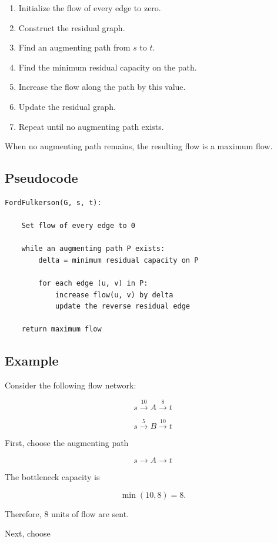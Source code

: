 \documentclass[12pt,a4paper]{article}
\begin{document}
\begin{enumerate}
    \item Initialize the flow of every edge to zero.
    \item Construct the residual graph.
    \item Find an augmenting path from $s$ to $t$.
    \item Find the minimum residual capacity on the path.
    \item Increase the flow along the path by this value.
    \item Update the residual graph.
    \item Repeat until no augmenting path exists.
\end{enumerate}

When no augmenting path remains, the resulting flow is a maximum flow.

\subsection{Pseudocode}

\begin{lstlisting}
FordFulkerson(G, s, t):

    Set flow of every edge to 0

    while an augmenting path P exists:
        delta = minimum residual capacity on P

        for each edge (u, v) in P:
            increase flow(u, v) by delta
            update the reverse residual edge

    return maximum flow
\end{lstlisting}

\subsection{Example}

Consider the following flow network:

\[
s \xrightarrow{10} A \xrightarrow{8} t
\]

\[
s \xrightarrow{5} B \xrightarrow{10} t
\]

First, choose the augmenting path

\[
s \rightarrow A \rightarrow t
\]

The bottleneck capacity is

\[
\min(10,8)=8.
\]

Therefore, 8 units of flow are sent.

Next, choose
\end{document}
